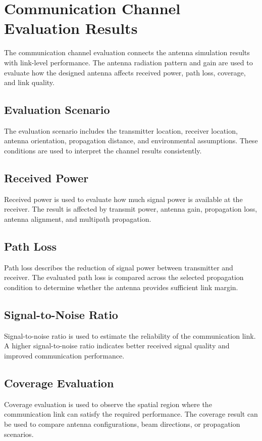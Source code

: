 \section{Communication Channel Evaluation Results}
The communication channel evaluation connects the antenna simulation results with link-level performance. The antenna radiation pattern and gain are used to evaluate how the designed antenna affects received power, path loss, coverage, and link quality.

\subsection{Evaluation Scenario}
The evaluation scenario includes the transmitter location, receiver location, antenna orientation, propagation distance, and environmental assumptions. These conditions are used to interpret the channel results consistently.

\subsection{Received Power}
Received power is used to evaluate how much signal power is available at the receiver. The result is affected by transmit power, antenna gain, propagation loss, antenna alignment, and multipath propagation.

\subsection{Path Loss}
Path loss describes the reduction of signal power between transmitter and receiver. The evaluated path loss is compared across the selected propagation condition to determine whether the antenna provides sufficient link margin.

\subsection{Signal-to-Noise Ratio}
Signal-to-noise ratio is used to estimate the reliability of the communication link. A higher signal-to-noise ratio indicates better received signal quality and improved communication performance.

\subsection{Coverage Evaluation}
Coverage evaluation is used to observe the spatial region where the communication link can satisfy the required performance. The coverage result can be used to compare antenna configurations, beam directions, or propagation scenarios.

